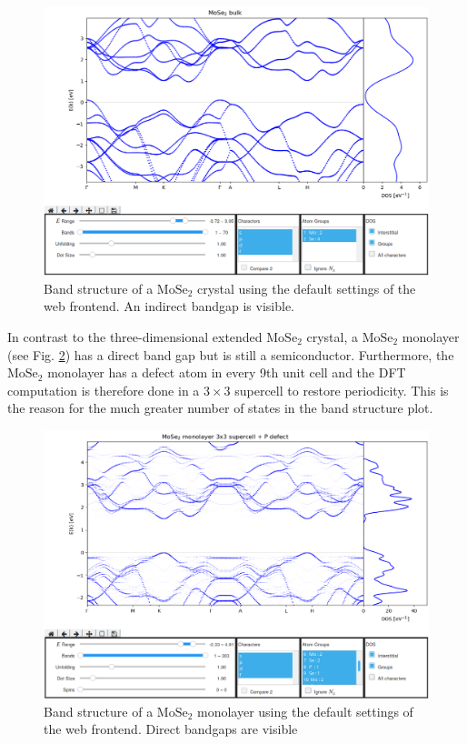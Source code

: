\begin{figure}[htb!]
    \centering
    \includegraphics[width=1.0\linewidth]{img/gui_web_mose2_crystal.png}
    \caption[Band structure of a $\textrm{MoSe}_2$ crystal]{Band structure of a $\textrm{MoSe}_2$ crystal using the default settings of the web frontend. An indirect bandgap is visible.}
    \label{example1}
\end{figure}

In contrast to the three-dimensional extended $\textrm{MoSe}_2$ crystal, a $\textrm{MoSe}_2$ monolayer (see Fig. \ref{example2}) has a direct band gap but is still a semiconductor. Furthermore, the $\textrm{MoSe}_2$ monolayer has a defect atom in every 9th unit cell and the DFT computation is therefore done in a $3 \times 3$ supercell to restore periodicity. This is the reason for the much greater number of states in the band structure plot. 

\begin{figure}[htb!]
    \centering
    \includegraphics[width=1.0\linewidth]{img/gui_web_mose2_monolayer_unfold-1.png}
    \caption[Band structure of a $\textrm{MoSe}_2$ monolayer]{Band structure of a $\textrm{MoSe}_2$ monolayer using the default settings of the web frontend. Direct bandgaps are visible}
    \label{example2}
\end{figure}


